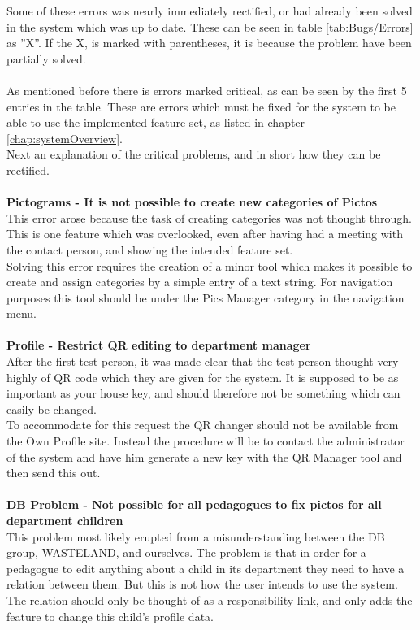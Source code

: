 Some of these errors was nearly immediately rectified, or had already been solved in the system which was up to date. These can be seen in table \ref{tab:Bugs/Errors} as ''X''. If the X, is marked with parentheses, it is because the problem have been partially solved.\\
\\
As mentioned before there is errors marked critical, as can be seen by the first 5 entries in the table. These are errors which must be fixed for the system to be able to use the implemented feature set, as listed in chapter \vref{chap:systemOverview}.\\
Next an explanation of the critical problems, and in short how they can be rectified.\\
\\
\textbf{Pictograms - It is not possible to create new categories of Pictos}\\
This error arose because the task of creating categories was not thought through. This is one feature which was overlooked, even after having had a meeting with the contact person, and showing the intended feature set.\\
Solving this error requires the creation of a minor tool which makes it possible to create and assign categories by a simple entry of a text string. For navigation purposes this tool should be under the Pics Manager category in the navigation menu.\\
\\
\textbf{Profile - Restrict QR editing to department manager}\\
After the first test person, it was made clear that the test person thought very highly of QR code which they are given for the system. It is supposed to be as important as your house key, and should therefore not be something which can easily be changed.\\
To accommodate for this request the QR changer should not be available from the Own Profile site. Instead the procedure will be to contact the administrator of the system and have him generate a new key with the QR Manager tool and then send this out.\\
\\
\textbf{DB Problem - Not possible for all pedagogues to fix pictos for all department children}\\
This problem most likely erupted from a misunderstanding between the DB group, WASTELAND, and ourselves. The problem is that in order for a pedagogue to edit anything about a child in its department they need to have a relation between them. But this is not how the user intends to use the system. The relation should only be thought of as a responsibility link, and only adds the feature to change this child's profile data.\\
